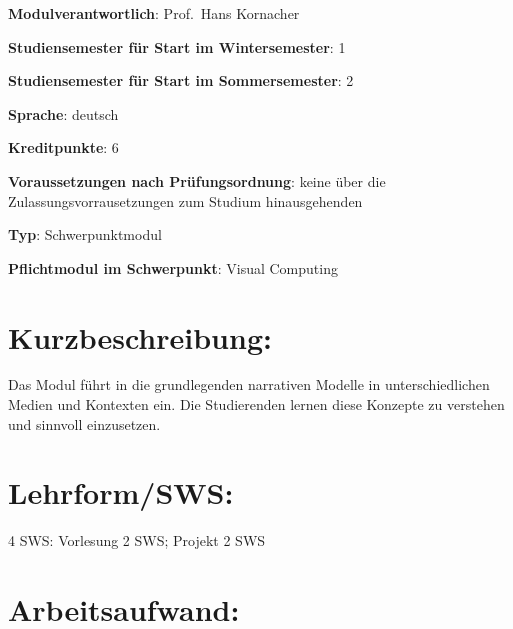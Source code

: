 \begin{modulHead}
\textbf{Modulverantwortlich}: Prof.~Hans
Kornacher
\end{modulHead}
\begin{modulHead}
\textbf{Studiensemester für
Start im Wintersemester}:
1
\end{modulHead}
\begin{modulHead}
\textbf{Studiensemester für Start
im Sommersemester}:
2
\end{modulHead}
\begin{modulHead}
\textbf{Sprache}:
deutsch
\end{modulHead}
\begin{modulHead}
\textbf{Kreditpunkte}:
6
\end{modulHead}
\begin{modulHead}
\textbf{Voraussetzungen nach
Prüfungsordnung}: keine über die Zulassungsvorrausetzungen zum Studium
hinausgehenden
\end{modulHead}
\begin{modulHead}
\textbf{Typ}:
Schwerpunktmodul
\end{modulHead}
\begin{modulHead}
\textbf{Pflichtmodul
im Schwerpunkt}: Visual Computing
\end{modulHead}


\section*{Kurzbeschreibung:\label{/mi-2017/modulbeschreibungen-master/MA_VC_Modul_Storytelling}}\label{kurzbeschreibungpathlabelmi-2017modulbeschreibungen-mastermaux5fvcux5fmodulux5fstorytelling}

Das Modul führt in die grundlegenden narrativen Modelle in
unterschiedlichen Medien und Kontexten ein. Die Studierenden lernen
diese Konzepte zu verstehen und sinnvoll einzusetzen.

\section*{Lehrform/SWS:\label{/mi-2017/modulbeschreibungen-master/MA_VC_Modul_Storytelling}}\label{lehrformswspathlabelmi-2017modulbeschreibungen-mastermaux5fvcux5fmodulux5fstorytelling}

4 SWS: Vorlesung 2 SWS; Projekt 2 SWS

\section*{Arbeitsaufwand:\label{/mi-2017/modulbeschreibungen-master/MA_VC_Modul_Storytelling}}\label{arbeitsaufwandpathlabelmi-2017modulbeschreibungen-mastermaux5fvcux5fmodulux5fstorytelling}

